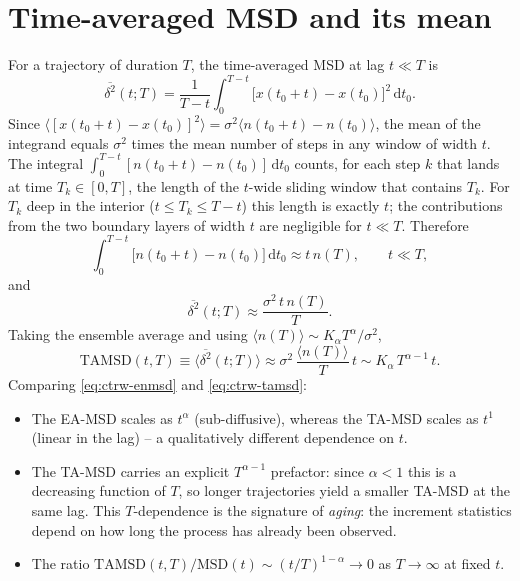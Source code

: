 \section*{Time-averaged MSD and its mean}

For a trajectory of duration $T$, the time-averaged MSD at lag $t\ll T$ is
\begin{equation}
  \overline{\delta^2}(t;T)=\frac{1}{T-t}\int_0^{T-t}
  \bigl[x(t_0+t)-x(t_0)\bigr]^2\,\mathrm{d}t_0 .
\end{equation}
Since $\langle[x(t_0+t)-x(t_0)]^2\rangle=\sigma^2\langle n(t_0+t)-n(t_0)\rangle$, the
mean of the integrand equals $\sigma^2$ times the mean number of steps in any window of
width $t$. The integral
$\int_0^{T-t}[n(t_0+t)-n(t_0)]\,\mathrm{d}t_0$ counts, for each step $k$ that lands at
time $T_k\in[0,T]$, the length of the $t$-wide sliding window that contains $T_k$. For
$T_k$ deep in the interior ($t\le T_k\le T-t$) this length is exactly $t$; the contributions
from the two boundary layers of width $t$ are negligible for $t\ll T$. Therefore
\begin{equation}
  \int_0^{T-t}\bigl[n(t_0+t)-n(t_0)\bigr]\,\mathrm{d}t_0 \approx t\,n(T),
  \qquad t\ll T ,
\end{equation}
and
\begin{equation}
  \overline{\delta^2}(t;T)\approx\frac{\sigma^2\,t\,n(T)}{T} .
  \label{eq:tamsd-approx}
\end{equation}
Taking the ensemble average and using $\langle n(T)\rangle\sim K_\alpha
T^\alpha/\sigma^2$,
\begin{equation}
  \mathrm{TAMSD}(t,T)\equiv\langle\overline{\delta^2}(t;T)\rangle
  \approx \sigma^2\,\frac{\langle n(T)\rangle}{T}\,t
  \sim K_\alpha\,T^{\alpha-1}\,t .
  \label{eq:ctrw-tamsd}
\end{equation}
Comparing \eqref{eq:ctrw-enmsd} and \eqref{eq:ctrw-tamsd}:
\begin{itemize}
  \item The EA-MSD scales as $t^\alpha$ (sub-diffusive), whereas the TA-MSD scales as $t^1$
        (linear in the lag) -- a qualitatively different dependence on $t$.
  \item The TA-MSD carries an explicit $T^{\alpha-1}$ prefactor: since $\alpha<1$ this is a
        decreasing function of $T$, so longer trajectories yield a smaller TA-MSD at the
        same lag. This $T$-dependence is the signature of \emph{aging}: the increment
        statistics depend on how long the process has already been observed.
  \item The ratio $\mathrm{TAMSD}(t,T)/\mathrm{MSD}(t)\sim(t/T)^{1-\alpha}\to 0$ as
        $T\to\infty$ at fixed $t$.
\end{itemize}

